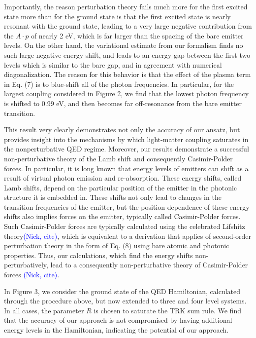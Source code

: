\documentclass[aps,prl,twocolumn,
	groupedaddress,superscriptaddress,
	amsfonts,amssymb,amsmath,floatfix,
	citeautoscript]{revtex4-1}
\newcommand{\Jadd}[1]{\textcolor{blue}{#1}}
\begin{document}
Importantly, the reason perturbation theory fails much more for the first excited state more than for the ground state is that the first excited state is nearly resonant with the ground state, leading to a very large negative contribution from the $A\cdot p$ of nearly 2 eV, which is far larger than the spacing of the bare emitter levels. On the other hand, the variational estimate from our formalism finds no such large negative energy shift, and leads to an energy gap between the first two levels which is similar to the bare gap, and in agreement with numerical diagonalization. The reason for this behavior is that the effect of the plasma term in Eq. (7) is to blue-shift all of the photon frequencies. In particular, for the largest coupling considered in Figure 2, we find that the lowest photon frequency is shifted to 0.99 eV, and then becomes far off-resonance from the bare emitter transition. 

This result very clearly demonstrates not only the accuracy of our ansatz, but provides insight into the mechanisms by which light-matter coupling saturates in the nonperturbative QED regime. Moreover, our results demonstrate a successful non-perturbative theory of the Lamb shift and consequently Casimir-Polder forces. In particular, it is long known that energy levels of emitters can shift as a result of virtual photon emission and re-absorption. These energy shifts, called Lamb shifts, depend on the particular position of the emitter in the photonic structure it is embedded in. These shifts not only lead to changes in the transition frequencies of the emitter, but the position dependence of these energy shifts also implies forces on the emitter, typically called Casimir-Polder forces. Such Casimir-Polder forces are typically calculated using the celebrated Lifshitz theory\Jadd{(Nick, cite)}, which is equivalent to a derivation that applies of second-order perturbation theory in the form of Eq. (8) using bare atomic and photonic properties. Thus, our calculations, which find the energy shifts non-perturbatively, lead to a consequently non-perturbative theory of Casimir-Polder forces \Jadd{(Nick, cite)}. 

In Figure 3, we consider the ground state of the QED Hamiltonian, calculated through the procedure above, but now extended to three and four level systems. In all cases, the parameter $R$ is chosen to saturate the TRK sum rule. We find that the accuracy of our approach is not compromised by having additional energy levels in the Hamiltonian, indicating the potential of our approach.
\end{document}

